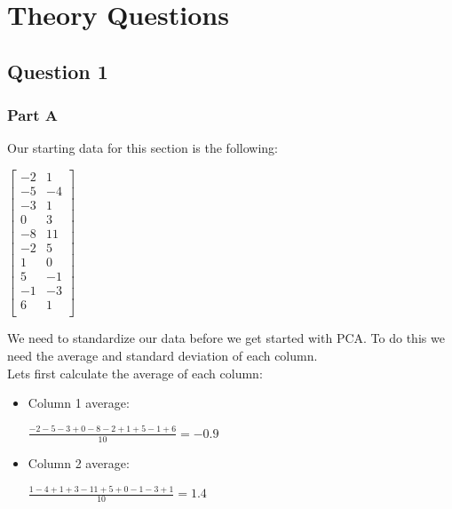 \documentclass[12pt]{article}
\begin{document}
\maketitle

\newpage
\section{Theory Questions}
\subsection{Question 1}
\subsubsection{Part A}
\noindent

Our starting data for this section is the following:

\begin{center}
    $\begin{bmatrix}
        -2 & 1\\
        -5 & -4\\
        -3 & 1\\
        0 & 3\\
        -8 & 11\\
        -2 & 5\\
        1 & 0\\
        5 & -1\\
        -1 & -3\\
        6 & 1\\
    \end{bmatrix}$
\end{center}


\noindent
We need to standardize our data before we get started with PCA. To do this we need the average and standard deviation of each column.\\


\noindent
Lets first calculate the average of each column:\\
\begin{itemize}
    \item
    Column 1 average:\\
    
    \begin{center}
        $\frac{-2-5-3+0-8-2+1+5-1+6}{10} = -0.9$\\
    \end{center}
    
    \item
    Column 2 average:\\
    
    \begin{center}
        $\frac{1-4+1+3-11+5+0-1-3+1}{10} = 1.4$\\
    \end{center}
    
\end{itemize}
\end{document}
